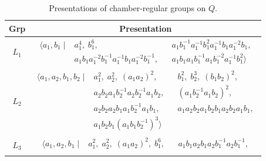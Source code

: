 \documentclass[dvipsnames]{article}
\theoremstyle{definition}
\theoremstyle{remark}
\begin{document}
    \begin{longtable}{ |c|c| }
    \caption{Presentations of chamber-regular groups on $Q$.}
    \label{tbl:presentations_quadrangle}\\
    \hline
    \textbf{Grp} & \textbf{Presentation} \\
    \hline
    $L_1$
    &
    \begin{minipage}{6cm}
        {
        \vspace{-2.5mm}
        \begin{align*}
            \big \langle
            a_1,b_1 \; \big | \;
            & a_1^4, \; b_1^6,
            && a_1 b_1^{-1} a_1^{-1} b_1^2 a_1^{-1} b_1 a_1^{-2} b_1, \\
            & a_1 b_1 a_1^{-2} b_1^{-1} a_1^{-1} b_1 a_1^{-2} b_1^{-1},
            && a_1 b_1 a_1 b_1^{-1} a_1 b_1^{-2} a_1^{-1} b_1^2 
            \big \rangle
        \end{align*}
        \vspace{-5mm}
        }
    \end{minipage}\\
    \hline
    $L_2$
    &
    \begin{minipage}{6cm}
        {
        \vspace{-2.5mm}
        \begin{align*}
            \big \langle
            a_1, a_2, b_1, b_2 \; \big | \;
            & a_1^2, \; a_2^2, \; (a_1a_2)^2,
            && b_1^2, \; b_2^3, \; (b_1b_2)^2, \\
            & a_2 b_2 a_1 b_2^{-1} a_2 b_2^{-1} a_1 b_2, 
            && (a_1 b_2^{-1} a_1 b_2)^2, \\
            & a_2 b_2 a_2 b_1 a_1 b_2^{-1} a_1 b_1, 
            && a_1 a_2 b_2 a_1 b_2 b_1 a_2 b_2 a_1 b_1,\\
            & a_1 b_2 b_1 (a_1b_1b_2^{-1})^3
            \big \rangle
        \end{align*}
        \vspace{-5mm}
        }
    \end{minipage}\\
    \hline
    $L_3$
    &
    \begin{minipage}{6cm}
        {
        \vspace{-2.5mm}
        \begin{align*}
            \big \langle
            a_1, a_2, b_1 \; \big | \;
            & a_1^2, \; a_2^2, \; (a_1 a_2)^2, \; b_1^6,
            && a_1 b_1 a_2 b_1 a_2 b_1^{-1} a_2 b_1^{-1},\\

\end{align*}}
\end{minipage}
\end{longtable}
\end{document}
